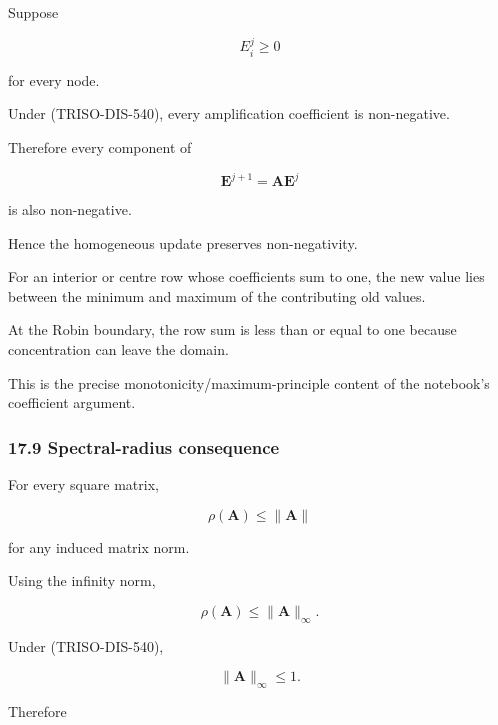 \documentclass[11pt,a4paper]{article}
\begin{document}
Suppose

\begin{equation}
E_i^j\ge0
\tag{TRISO-DIS-560}
\label{eq:triso-dis-560}
\end{equation}

for every node.

Under (TRISO-DIS-540), every amplification coefficient is non-negative.

Therefore every component of

\begin{equation}
\mathbf E^{j+1}
=
\mathbf A\mathbf E^j
\tag{TRISO-DIS-561}
\label{eq:triso-dis-561}
\end{equation}

is also non-negative.

Hence the homogeneous update preserves non-negativity.

For an interior or centre row whose coefficients sum to one, the new value lies between the minimum and maximum of the contributing old values.

At the Robin boundary, the row sum is less than or equal to one because concentration can leave the domain.

This is the precise monotonicity/maximum-principle content of the notebook's coefficient argument.

\subsubsection*{17.9 Spectral-radius consequence}

For every square matrix,

\begin{equation}
\rho(\mathbf A)
\le
\|\mathbf A\|
\tag{TRISO-DIS-562}
\label{eq:triso-dis-562}
\end{equation}

for any induced matrix norm.

Using the infinity norm,

\begin{equation}
\rho(\mathbf A)
\le
\|\mathbf A\|_\infty.
\tag{TRISO-DIS-563}
\label{eq:triso-dis-563}
\end{equation}

Under (TRISO-DIS-540),

\begin{equation}
\|\mathbf A\|_\infty\le1.
\tag{TRISO-DIS-564}
\label{eq:triso-dis-564}
\end{equation}

Therefore
\end{document}
